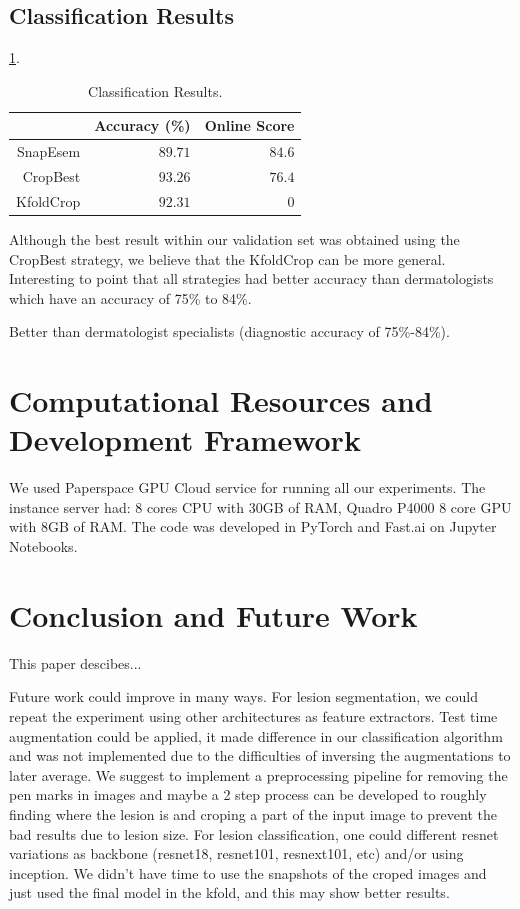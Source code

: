 \documentclass[conference]{IEEEtran}
\begin{document}
\subsection{Classification Results}

\ref{tabela}.
\begin{table}[]
\centering
\caption{Classification Results.}
\label{tabela}
\begin{tabular}{@{}rrr@{}}
\toprule
            & \multicolumn{1}{c}{Accuracy (\%)} & \multicolumn{1}{c}{Online Score} \\ \midrule
SnapEsem & \(89.71\)& \(84.6\)                                  \\ \midrule
CropBest   & \(93.26\)&  \(76.4\)                                \\ \midrule
KfoldCrop    & \(92.31\)  & \(0\)                              \\ \bottomrule
\end{tabular}
\end{table}

Although the best result within our validation set was obtained using the CropBest strategy, we believe that the KfoldCrop can be more general. Interesting to point that all strategies had better accuracy than dermatologists which have an accuracy of 75\% to 84\%\cite{isic}. 

Better than dermatologist specialists (diagnostic accuracy of 75\%-84\%).

\section{Computational Resources and Development Framework\label{resources}}
We used Paperspace GPU Cloud service for running all our experiments. The instance server had: 8 cores CPU with 30GB of RAM, Quadro P4000 8 core GPU with 8GB of RAM. 
The code was developed in PyTorch and Fast.ai\cite{fastai} on Jupyter Notebooks.
\section{Conclusion and Future Work}

This paper descibes... 

Future work could improve in many ways. For lesion segmentation, we could repeat the experiment using other architectures as feature extractors. Test time augmentation could be applied, it made difference in our classification algorithm and was not implemented due to the difficulties of inversing the augmentations to later average.  We suggest to implement a preprocessing pipeline for removing the pen marks in images and maybe a 2 step process can be developed to roughly finding where the lesion is and croping a part of the input image to prevent the bad results due to lesion size. For lesion classification, one could different resnet variations as backbone (resnet18, resnet101, resnext101, etc) and/or using inception. We didn't have time to use the snapshots of the croped images and just used the final model in the kfold, and this may show better results.





\end{document}
